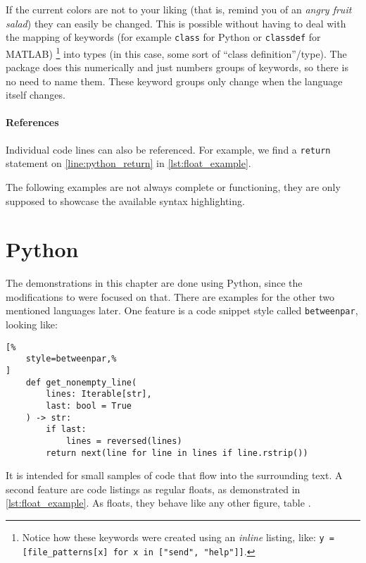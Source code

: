 If the current colors are not to your liking (that is, remind you of an
\emph{angry fruit salad}) they can easily be changed.
This is possible without having to deal with the mapping of keywords (for example
\lstinline[language={[3]Python}]|class| for Python or
\lstinline[language={[Custom]Matlab}]|classdef| for MATLAB)%
\footnote{%
    Notice how these keywords were created using an \emph{inline} listing, like:
    \lstinline[language={[3]Python}]|y = [file_patterns[x] for x in ["send", "help"]]|.
}
into types (in this case, some sort of \enquote{class definition}\-/type).
The  package does this numerically and just numbers groups of
keywords, so there is no need to name them.
These keyword groups only change when the language itself changes.

\paragraph{References}
Individual code lines can also be referenced.
For example, we find a \lstinline[language={[3]Python}]|return| statement on
\cref{line:python_return} in \cref{lst:float_example}.

The following examples are not always complete or functioning, they are only supposed
to showcase the available syntax highlighting.

\section{Python}

The demonstrations in this chapter are done using Python, since the modifications to
 were focused on that.
There are examples for the other two mentioned languages later.
One feature is a code snippet style called \texttt{betweenpar}, looking like:
\begin{lstlisting}[%
    style=betweenpar,%
]
    def get_nonempty_line(
        lines: Iterable[str],
        last: bool = True
    ) -> str:
        if last:
            lines = reversed(lines)
        return next(line for line in lines if line.rstrip())
\end{lstlisting}
It is intended for small samples of code that flow into the surrounding text.
A second feature are code listings as regular floats, as demonstrated in
\cref{lst:float_example}.
As floats, they behave like any other figure, table .

